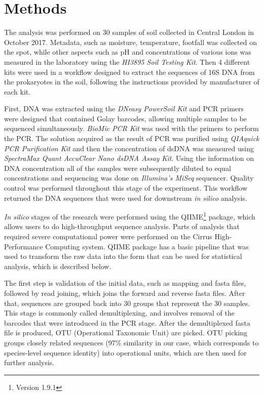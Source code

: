\documentclass[12pt,twocolumn]{article} %
\begin{document}
\section{Methods}
The analysis was performed on 30 samples of soil collected in Central London in October 2017.  Metadata, such as moisture, temperature, footfall was collected on the spot, while other aspects such as pH and concentrations of various ions was measured in the laboratory using the \textit{HI3895 Soil Testing Kit}. Then 4 different kits were used in a workflow designed to extract the sequences of 16S DNA from the prokaryotes in the soil, following the instructions provided by manufacturer of each kit.
\par
First, DNA was extracted using the \textit{DNeasy PowerSoil Kit} and PCR primers were designed that contained Golay barcodes, allowing multiple samples to be sequenced simultaneously. \textit{BioMic PCR Kit} was used with the primers to perform the PCR. The solution acquired as the result of PCR was purified using \textit{QIAquick PCR Purification Kit} and then the concentration of dsDNA was measured using \textit{SpectraMax Quant AccuClear Nano dsDNA Assay Kit}. Using the information on DNA concentration all of the samples were subsequently diluted to equal concentrations and sequencing was done on \textit{Illumina's MiSeq} sequencer. Quality control was performed throughout this stage of the experiment. This workflow returned the DNA sequences that were used for downstream \textit{in silico} analysis.
\par
\textit{In silico} stages of the research were performed using the QIIME\footnote{Version 1.9.1} package\cite{Caporaso2010,Kuczynski2012}, which allows users to do high-throughput sequence analysis. Parts of analysis that required severe computational power were performed on the Cirrus High-Performance Computing system. QIIME package has a basic pipeline that was used to transform the raw data into the form that can be used for statistical analysis, which is described below.
\par
The first step is validation of the initial data, such as mapping and fasta files, followed by read joining, which joins the forward and reverse fasta files. After that, sequences are grouped back into 30 groups that represent the 30 samples. This stage is commonly called demultiplexing, and involves removal of the barcodes that were introduced in the PCR stage. After the demultiplexed fasta file is produced, OTU (Operational Taxonomic Unit) are picked. OTU picking groups closely related sequences (97\% similarity in our case, which corresponds to species-level sequence identity) into operational units, which are then used for further analysis.
\end{document}
